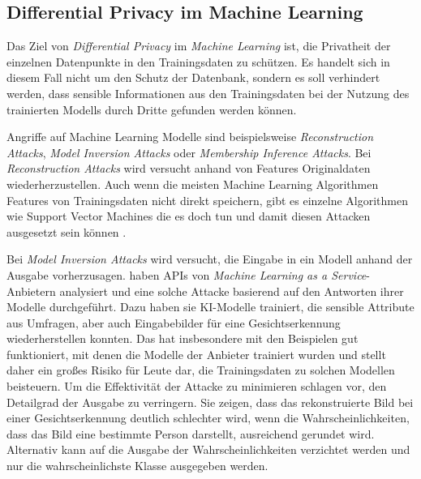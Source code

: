 \subsection{Differential Privacy im Machine Learning}\label{sec:fund-dp-in-ml}


Das Ziel von \textit{Differential Privacy} im \textit{Machine Learning} ist, die Privatheit der einzelnen Datenpunkte in den Trainingsdaten zu schützen. Es handelt sich in diesem Fall nicht um den Schutz der Datenbank, sondern es soll verhindert werden, dass sensible Informationen aus den Trainingsdaten bei der Nutzung des trainierten Modells durch Dritte gefunden werden können. 

Angriffe auf Machine Learning Modelle sind beispielsweise \textit{Reconstruction Attacks}, \textit{Model Inversion Attacks} oder \textit{Membership Inference Attacks}. Bei \textit{Reconstruction Attacks} wird versucht anhand von Features Originaldaten wiederherzustellen. Auch wenn die meisten Machine Learning Algorithmen Features von Trainingsdaten nicht direkt speichern, gibt es einzelne Algorithmen wie Support Vector Machines die es doch tun und damit diesen Attacken ausgesetzt sein können \cite[p.9ff]{chang:2023}.

Bei \textit{Model Inversion Attacks} wird versucht, die Eingabe in ein Modell anhand der Ausgabe vorherzusagen. \textcite{fredrikson:2015} haben APIs von \textit{Machine Learning as a Service}-Anbietern analysiert und eine solche Attacke basierend auf den Antworten ihrer Modelle durchgeführt. Dazu haben sie KI-Modelle trainiert, die sensible Attribute aus Umfragen, aber auch Eingabebilder für eine Gesichtserkennung wiederherstellen konnten. Das hat insbesondere mit den Beispielen gut funktioniert, mit denen die Modelle der Anbieter trainiert wurden und stellt daher ein großes Risiko für Leute dar, die Trainingsdaten zu solchen Modellen beisteuern. Um die Effektivität der Attacke zu minimieren schlagen \citeauthor{fredrikson:2015} vor, den Detailgrad der Ausgabe zu verringern. Sie zeigen, dass das rekonstruierte Bild bei einer Gesichtserkennung deutlich schlechter wird, wenn die Wahrscheinlichkeiten, dass das Bild eine bestimmte Person darstellt, ausreichend gerundet wird. Alternativ kann auf die Ausgabe der Wahrscheinlichkeiten verzichtet werden und nur die wahrscheinlichste Klasse ausgegeben werden.

